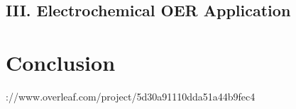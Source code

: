\documentclass[journal=jacsat,manuscript=article]{achemso}
\begin{document}
  \subsection{III. Electrochemical OER Application}
  

\section{Conclusion}



\begin{acknowledgement}

\end{acknowledgement}

\clearpage
\appendixhttps://www.overleaf.com/project/5d30a91110dda51a44b9fec4
\renewcommand{\thefigure}{S\arabic{figure}}
\setcounter{figure}{0}
\renewcommand{\thetable}{S\arabic{table}}
\setcounter{table}{0}

\begin{suppinfo}

\end{suppinfo}


\end{document}
